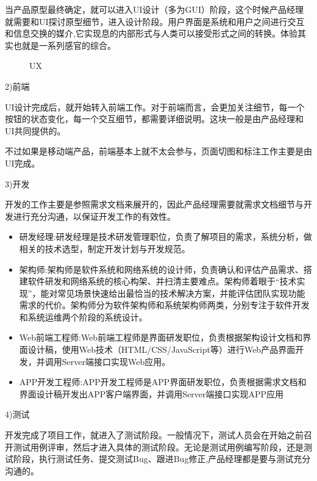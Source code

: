 \documentclass[letterpaper,10pt,english]{sphinxmanual}
\begin{document}
当产品原型最终确定，就可以进入UI设计（多为GUI）阶段，这个时候产品经理就需要和UI探讨原型细节，进入设计阶段。用户界面是系统和用户之间进行交互和信息交换的媒介,它实现息的内部形式与人类可以接受形式之间的转换。体验其实也就是一系列感官的综合。

\begin{figure}[H]
\centering
\capstart

\noindent{}
\caption{UX}\label{\detokenize{chapter_introduction/PM:id69}}\end{figure}

2)前端

UI设计完成后，就开始转入前端工作。对于前端而言，会更加关注细节，每一个按钮的状态变化，每一个交互细节，都需要详细说明。这块一般是由产品经理和UI共同提供的。

不过如果是移动端产品，前端基本上就不太会参与，页面切图和标注工作主要是由UI完成。

3)开发

开发的工作主要是参照需求文档来展开的，因此产品经理需要就需求文档细节与开发进行充分沟通，以保证开发工作的有效性。
\begin{itemize}
\item {} 
研发经理:研发经理是技术研发管理职位，负责了解项目的需求，系统分析，做相关的技术选型，制定开发计划与开发规范。

\item {} 
架构师:架构师是软件系统和网络系统的设计师，负责确认和评估产品需求、搭建软件研发和网络系统的核心构架、并扫清主要难点。架构师着眼于“技术实现”，能对常见场景快速给出最恰当的技术解决方案，并能评估团队实现功能需求的代价。架构师分为软件架构师和系统架构师两类，分别专注于软件开发和系统运维两个阶段的系统设计。

\item {} 
Web前端工程师:Web前端工程师是界面研发职位，负责根据架构设计文档和界面设计稿，使用Web技术（HTML/CSS/JavaScript等）进行Web产品界面开发，并调用Server端接口实现Web应用。

\item {} 
APP开发工程师:APP开发工程师是APP界面研发职位，负责根据需求文档和界面设计稿开发出APP客户端界面，并调用Server端接口实现APP应用

\end{itemize}

4)测试

开发完成了项目工作，就进入了测试阶段。一般情况下，测试人员会在开始之前召开测试用例评审，然后才进入具体的测试阶段。无论是测试用例编写阶段，还是测试阶段，执行测试任务、提交测试Bug、跟进Bug修正,产品经理都是要与测试充分沟通的。
\end{document}
